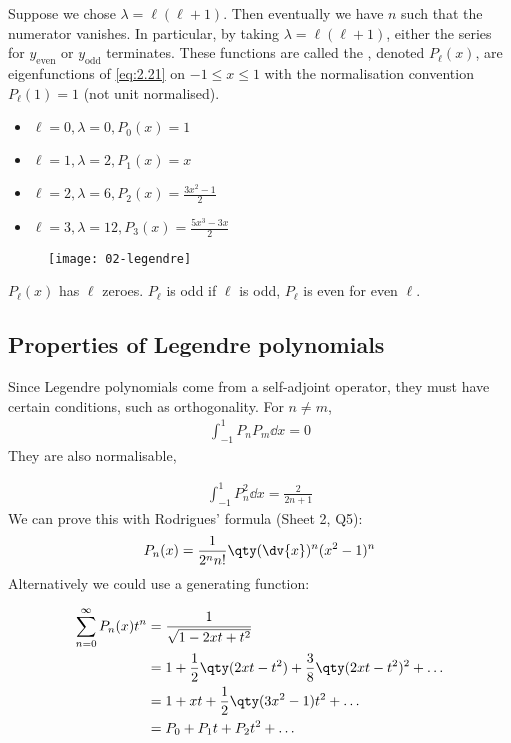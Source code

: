 Suppose we chose $\lambda = \ell (\ell + 1)$.
Then eventually we have $n$ such that the numerator vanishes.
In particular, by taking $\lambda = \ell (\ell + 1)$, either the series for $y_{\text{even}}$ or $y_{\text{odd}}$ terminates.
These functions are called the , denoted $P_\ell(x)$, are eigenfunctions of \cref{eq:2.21} on $-1 \leq x \leq 1$ with the normalisation convention $P_\ell(1) = 1$ (not unit normalised).
\begin{itemize} \label{eq:2.23}
    \item $\ell = 0, \lambda = 0, P_0(x) = 1$
    \item $\ell = 1, \lambda = 2, P_1(x) = x$
    \item $\ell = 2, \lambda = 6, P_2(x) = \frac{3x^2 - 1}{2}$
    \item $\ell = 3, \lambda = 12, P_3(x) = \frac{5x^3 - 3x}{2}$
\end{itemize}
\begin{figure}[h] 
    \centering 
    \texttt{[image: 02-legendre]} 
\end{figure}
\begin{note}
    $P_\ell(x)$ has $\ell$ zeroes.
    $P_\ell$ is odd if $\ell$ is odd, $P_\ell$ is even for even $\ell$.
\end{note} 

\subsection{Properties of Legendre polynomials}
Since Legendre polynomials come from a self-adjoint operator, they must have certain conditions, such as orthogonality.
For $n \neq m$,
\begin{align*}
    \int_{-1}^1 P_n P_m \dd{x} = 0
\end{align*}
They are also normalisable,
\addtocounter{equation}{1}
\begin{align} \label{eq:2.24}
    \int_{-1}^1 P_n^2 \dd{x} = \frac{2}{2n+1}
\end{align}
We can prove this with Rodrigues' formula (Sheet 2, Q5):
\begin{align*}
    P_n(x) = \frac{1}{2^n n!} \qty( \dv{x} )^n (x^2 - 1)^n
\end{align*}
Alternatively we could use a generating function:
\addtocounter{equation}{-2}
\begin{subequations}
    \begin{align} \label{eq:2.23a}
        \sum_{n=0}^\infty P_n(x) t^n &= \frac{1}{\sqrt{1 - 2xt + t^2}} \\
        &= 1 + \frac{1}{2}\qty(2xt - t^2) + \frac{3}{8}\qty(2xt - t^2)^2 + \dots \notag \\
        & = 1 + xt + \frac{1}{2}\qty(3x^2 - 1)t^2 + \dots \notag \\
        &= P_0 + P_1 t + P_2 t^2 + \dots \notag
    \end{align}
\end{subequations}

